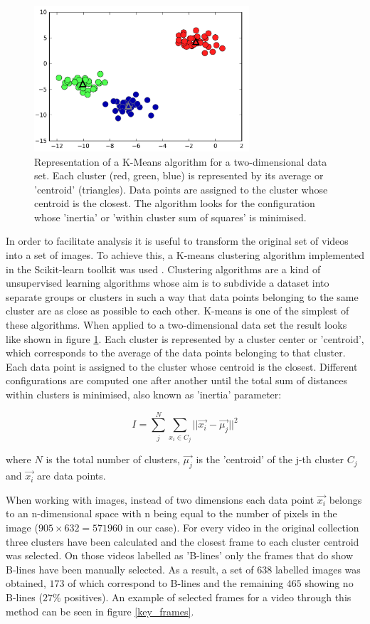 \documentclass[12pt]{article} %
\begin{document}
	\begin{figure}
	\centering
	\includegraphics[width=8cm]{figuras/clusters.png}
	\caption{\small Representation of a K-Means algorithm for a two-dimensional data set. Each cluster (red, green, blue) is represented by its average or 'centroid' (triangles). Data points are assigned to the cluster whose centroid is the closest. The algorithm looks for the configuration whose 'inertia' or 'within cluster sum of squares' is minimised.\cite{python}}
	\label{clustering}
	\end{figure}
	
	In order to facilitate analysis it is useful to transform the original set of videos into a set of images. To achieve this, a K-means clustering algorithm implemented in the Scikit-learn toolkit was used \cite{sklearn}. Clustering algorithms are a kind of unsupervised learning algorithms whose aim is to subdivide a dataset into separate groups or clusters in such a way that data points belonging to the same cluster are as close as possible to each other. K-means is one of the simplest of these algorithms. When applied to a two-dimensional data set the result looks like shown in figure \ref{clustering}\cite{python}. Each cluster is represented by a cluster center or 'centroid', which corresponds to the average of the data points belonging to that cluster. Each data point is assigned to the cluster whose centroid is the closest. Different configurations are computed one after another until the total sum of distances within clusters is minimised, also known as 'inertia' parameter:
	
\begin{equation}
I = \sum_j^N \sum_{x_i \in C_j} || \vec{x_i} - \vec{ \mu_j} ||^2
\end{equation}
	
	where $N$ is the total number of clusters, $\vec{\mu_j}$ is the 'centroid' of the j-th cluster $C_j$ and $\vec{x_i}$ are data points.
	
	When working with images, instead of two dimensions each data point $\vec{x_i}$ belongs to an n-dimensional space with n being equal to the number of pixels in the image ($905 \times 632=571960$ in our case). For every video in the original collection  three clusters have been calculated and the closest frame to each cluster centroid was selected. On those videos labelled as 'B-lines' only the frames that do show B-lines have been manually selected. As a result, a set of $638$ labelled images was obtained, $173$ of which correspond to B-lines and the remaining $465$ showing no B-lines ($27 \% $ positives). An example of selected frames for a video through this method can be seen in figure \ref{key_frames}.
	
\end{document}
